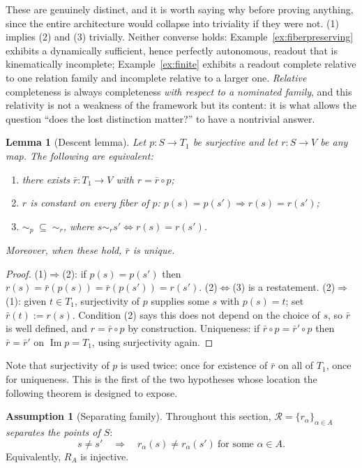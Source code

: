 \documentclass[11pt,reqno]{amsart}
\theoremstyle{plain}
\newtheorem{lemma}[theorem]{Lemma}
\theoremstyle{definition}
\newtheorem{assumption}[theorem]{Assumption}
\theoremstyle{remark}
\DeclareMathOperator{\Ima}{Im}
\begin{document}
These are genuinely distinct, and it is worth saying why before proving anything, since the entire architecture would collapse into triviality if they were not. (1) implies (2) and (3) trivially. Neither converse holds: Example~\ref{ex:fiberpreserving} exhibits a dynamically sufficient, hence perfectly autonomous, readout that is kinematically incomplete; Example~\ref{ex:finite} exhibits a readout complete relative to one relation family and incomplete relative to a larger one. \emph{Relative} completeness is always completeness \emph{with respect to a nominated family}, and this relativity is not a weakness of the framework but its content: it is what allows the question ``does the lost distinction matter?'' to have a nontrivial answer.

\begin{lemma}[Descent lemma]\label{lem:descent}
Let $p\colon S\to T_1$ be surjective and let $r\colon S\to V$ be any map. The following are equivalent:
\begin{enumerate}
\item there exists $\bar r\colon T_1\to V$ with $r=\bar r\circ p$;
\item $r$ is constant on every fiber of $p$: $p(s)=p(s')\Rightarrow r(s)=r(s')$;
\item $\sim_p\;\subseteq\;\sim_r$, where $s\sim_r s'\iff r(s)=r(s')$.
\end{enumerate}
Moreover, when these hold, $\bar r$ is unique.
\end{lemma}

\begin{proof}
(1)$\Rightarrow$(2): if $p(s)=p(s')$ then $r(s)=\bar r(p(s))=\bar r(p(s'))=r(s')$. (2)$\Leftrightarrow$(3) is a restatement. (2)$\Rightarrow$(1): given $t\in T_1$, surjectivity of $p$ supplies some $s$ with $p(s)=t$; set $\bar r(t):=r(s)$. Condition (2) says this does not depend on the choice of $s$, so $\bar r$ is well defined, and $r=\bar r\circ p$ by construction. Uniqueness: if $\bar r\circ p=\bar r'\circ p$ then $\bar r=\bar r'$ on $\Ima p=T_1$, using surjectivity again.
\end{proof}

Note that surjectivity of $p$ is used twice: once for existence of $\bar r$ on all of $T_1$, once for uniqueness. This is the first of the two hypotheses whose location the following theorem is designed to expose.

\begin{assumption}[Separating family]\label{ass:separating}
Throughout this section, $\mathcal R=\{r_\alpha\}_{\alpha\in A}$ \emph{separates the points of $S$}:
\begin{equation}\label{eq:separating}
s\neq s'\quad\Longrightarrow\quad r_\alpha(s)\neq r_\alpha(s')\ \text{for some }\alpha\in A.
\end{equation}
Equivalently, $R_A$ is injective.
\end{assumption}
\end{document}

